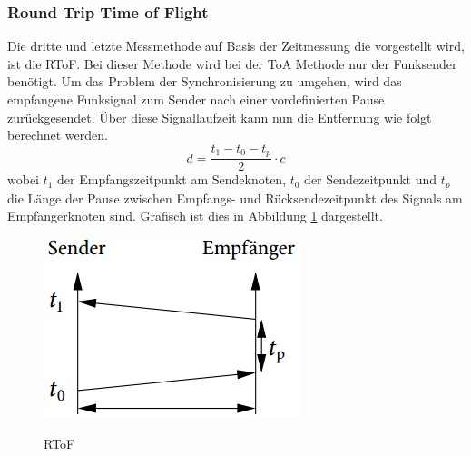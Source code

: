 \subsubsection{Round Trip Time of Flight}
Die dritte und letzte Messmethode auf Basis der Zeitmessung die vorgestellt wird, ist die \ac{RToF}. Bei dieser Methode wird bei der ToA Methode nur der Funksender benötigt. Um das Problem der Synchronisierung zu umgehen, wird das empfangene Funksignal zum Sender nach einer vordefinierten Pause zurückgesendet. Über diese Signallaufzeit kann nun die Entfernung wie folgt berechnet werden.
\begin{equation}
  \label{eq:RToF}
    d = \frac{t_{1} - t_{0} - t_{p}}{2} \cdot c
\end{equation}
wobei $t_{1}$ der Empfangszeitpunkt am Sendeknoten, $t_{0}$ der Sendezeitpunkt und $t_{p}$ die Länge der Pause zwischen Empfangs- und Rücksendezeitpunkt des Signals am Empfängerknoten sind.
Grafisch ist dies in Abbildung \ref{fig:RToF} dargestellt.
\begin{figure}[h!]
  \caption{RToF}
  \includegraphics[scale=0.35]{img/time3}
  \label{fig:RToF}
\end{figure}
